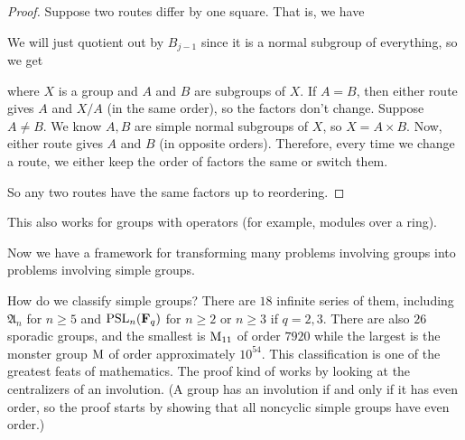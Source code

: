 \documentclass[11pt, twoside]{amsart}
\begin{document}
\begin{proof}
Suppose two routes differ by one square. That is, we have 
\begin{center}
\end{center}
We will just quotient out by $B_{j-1}$ since it is a normal subgroup of everything, so we get 
\begin{center}
\end{center}
where $X$ is a group and $A$ and $B$ are subgroups of $X$. If $A=B$, then either route gives $A$ and $X/A$ (in the same order), so the factors don't change. Suppose $A\ne B$. We know $A, B$ are simple normal subgroups of $X$, so $X = A\times B$. Now, either route gives $A$ and $B$ (in opposite orders). Therefore, every time we change a route, we either keep the order of factors the same or switch them. 

So any two routes have the same factors up to reordering. 
\end{proof}
This also works for groups with operators (for example, modules over a ring).

Now we have a framework for transforming many problems involving groups into problems involving simple groups. 

How do we classify simple groups? There are $18$ infinite series of them, including $\mathfrak{A}_n$ for $n\ge 5$ and $\operatorname{PSL}_n(\mathbf F_q)$ for $n\ge 2$ or $n\ge 3$ if $q=2,3$. There are also $26$ sporadic groups, and the smallest is $\operatorname{M}_{11}$ of order $7920$ while the largest is the monster group $\operatorname{M}$ of order approximately $10^{54}$. This classification is one of the greatest feats of mathematics. The proof kind of works by looking at the centralizers of an involution. (A group has an involution if and only if it has even order, so the proof starts by showing that all noncyclic simple groups have even order.)
\end{document}
